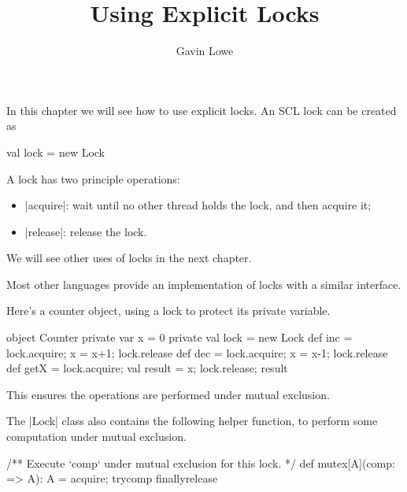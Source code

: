 \documentclass[notes,color]{sepslide0}
\title{Using Explicit Locks}
\author{Gavin Lowe}
\begin{document}
\begin{slide}
  
  \Title

\end{slide}


\begin{slide}

In this chapter we will see how to use explicit locks.  An SCL lock can be
created as
%
\begin{scala}
val lock = new Lock
\end{scala}

A lock has two principle operations:
%
\begin{itemize}
\item |acquire|: wait until no other thread holds the lock, and then acquire
  it;

\item |release|: release the lock.
\end{itemize}

We will see other uses of locks in the next chapter. 

Most other languages provide an implementation of locks with a similar
interface. 
\end{slide}


\begin{slide}

Here's a counter object, using a lock to protect its private variable.
%
\begin{scala}
object Counter{
  private var x = 0
  private val lock = new Lock
  def inc = { lock.acquire; x = x+1; lock.release }
  def dec = { lock.acquire; x = x-1; lock.release }
  def getX = { lock.acquire; val result = x; lock.release; result }
}
\end{scala}
%
This ensures the operations are performed under mutual exclusion. 
\end{slide}


\begin{slide}

The |Lock| class also contains the following helper function, to perform some
computation under mutual exclusion. 
\begin{scala}
  /** Execute `comp` under mutual exclusion for this lock. */
  def mutex[A](comp: => A): A = {
    acquire; try{comp} finally{release}
  } 
\end{scala}
\end{slide}
\end{document}
